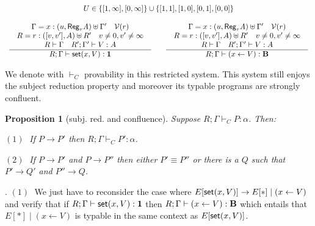 \documentclass[11pt]{article}
\newcommand{\Proofitemf}[1]{\noindent $#1\;$}
\newcommand{\Defitem}[1]{\smallskip \noindent $#1\;$}
\newtheorem{proposition}[theorem]{Proposition}
\newcommand{\Proof}{\noindent {\sc Proof}. }
\newcommand{\Gives}{\vdash}             \newcommand{\IGives}{\vdash_{I}}        \newcommand{\AIGives}{\vdash_{{\it AI}}} \newcommand{\CGives}{\vdash_{C}}
\newcommand{\arrow}{\rightarrow}        \newcommand{\trarrow}{\stackrel{*}{\rightarrow}}        \newcommand{\limp}{\multimap} \newcommand{\bang}{\oc}
\newcommand{\hyp}[3]{#1:(#2, #3)}
\newcommand{\behtype}{{\bf B}}
\newcommand{\csum}{\uplus}              \newcommand{\dpar}{\mid\!\mid}
\newcommand{\infer}[2]{\begin{array}{c} #1 \\ \hline #2 \end{array}}
\newcommand{\set}[1]{\{#1\}}
\newcommand{\st}[2]{{\sf set}(#1,#2)}
\newcommand{\rgtype}[2]{{\it {\sf Reg}_{#1} #2}}
\newcommand{\store}[2]{(#1 \leftarrow #2)}
\newcommand{\upair}[2]{[#1,#2]}
\newcommand{\vlt}[1]{{\cal V}(#1)}
\begin{document}
\begin{table}
{\footnotesize
\[
\begin{array}{c}

U\in \set{\upair{1}{\infty},\upair{0}{\infty}} \union 
     \set{\upair{1}{1},\upair{1}{0},\upair{0}{1},\upair{0}{0}} \\ \\

\infer{\begin{array}{c}
\Gamma= \hyp{x}{u}{\rgtype{r}{A}} \csum \Gamma' \quad \vlt{r}\\
R = \hyp{r}{\upair{v}{v'}}{A} \csum R' \quad v \neq 0, v'\neq \infty \\
R\Gives \Gamma\quad R';\Gamma'\Gives V:A
\end{array}}
{R;\Gamma \Gives \st{x}{V}:\tertype} 

\qquad

\infer{\begin{array}{c}
\Gamma= \hyp{x}{u}{\rgtype{r}{A}} \csum \Gamma' \quad \vlt{r}\\
R = \hyp{r}{\upair{v}{v'}}{A} \csum R' \quad v \neq 0, v'\neq \infty \\
R\Gives \Gamma\quad R';\Gamma'\Gives V:A
\end{array}}
{R;\Gamma \Gives \store{x}{V}:\behtype} 

\end{array}
\]}
\caption{Restricted usages and restricted rules for confluence}\label{rules-confluence}
\end{table}
We denote with $\CGives$ provability in this restricted system.
This system still enjoys the subject reduction property and moreover
its typable programs are strongly confluent.

\begin{proposition}[subj. red. and confluence]\label{confluence-thm}
Suppose $R;\Gamma\CGives P:\alpha$. Then:

\Defitem{(1)} If $P\arrow P'$ then $R;\Gamma\CGives P':\alpha$.

\Defitem{(2)} If $P\arrow P'$ and $P\arrow P''$ then either $P'\equiv P''$ or
there is a $Q$ such that $P'\arrow Q'$ and $P'' \arrow Q$.
\end{proposition}
\Proof
\Proofitemf{(1)} We just have to reconsider the case
where $E[\st{x}{V}] \arrow E[*] \mid \store{x}{V}$ and verify
that if $R;\Gamma \Gives \st{x}{V}:\tertype$ then 
$R;\Gamma \Gives \store{x}{V}:\behtype$ which entails that
$E[*]\mid \store{x}{V}$ is typable in the same context as 
$E[\st{x}{V}]$.
\end{document}
